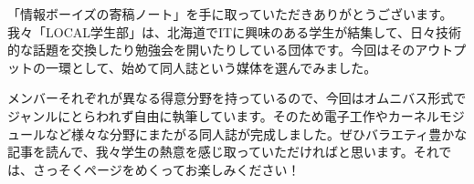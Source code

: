 「情報ボーイズの寄稿ノート」を手に取っていただきありがとうございます。我々「LOCAL学生部」は、北海道でITに興味のある学生が結集して、日々技術的な話題を交換したり勉強会を開いたりしている団体です。今回はそのアウトプットの一環として、始めて同人誌という媒体を選んでみました。

メンバーそれぞれが異なる得意分野を持っているので、今回はオムニバス形式でジャンルにとらわれず自由に執筆しています。そのため電子工作やカーネルモジュールなど様々な分野にまたがる同人誌が完成しました。ぜひバラエティ豊かな記事を読んで、我々学生の熱意を感じ取っていただければと思います。それでは、さっそくページをめくってお楽しみください！